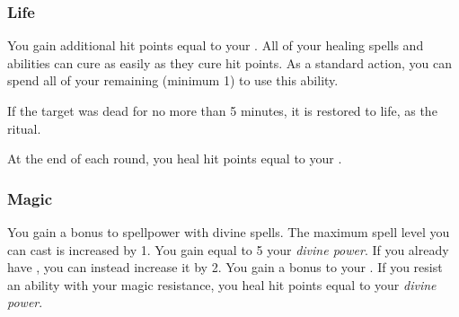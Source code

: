         \subsubsection{Life}
             You gain additional hit points equal to your .
             All of your healing spells and abilities can cure  as easily as they cure hit points.
             As a standard action, you can spend all of your remaining  (minimum 1) to use this ability.
            \begin{ability}
                \begin{spelltargetinginfo}
                \end{spelltargetinginfo}
                \begin{spelleffects}
                    \spelleffect If the target was dead for no more than 5 minutes, it is restored to life, as the  ritual.
                \end{spelleffects}
            \end{ability}
             At the end of each round, you heal hit points equal to your .

        \subsubsection{Magic}
             You gain a  bonus to spellpower with divine spells.
             The maximum spell level you can cast is increased by 1.
             You gain  equal to 5 \add your \textit{divine power}.
            If you already have , you can instead increase it by 2.
             You gain a  bonus to your .
            If you resist an ability with your magic resistance, you heal hit points equal to your \textit{divine power}.

